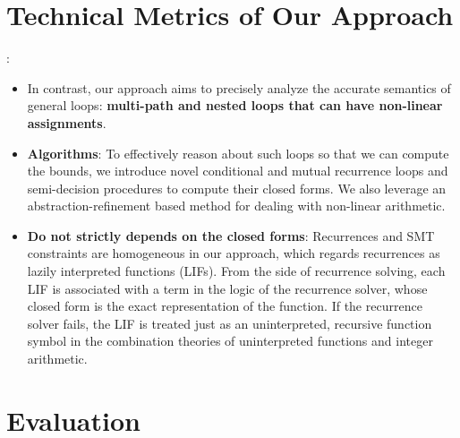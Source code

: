 \documentclass{article}
\begin{document}
\section{Technical Metrics of Our Approach}:
\begin{itemize}
\item In contrast, our approach aims to precisely analyze the accurate semantics of general loops: \textbf{multi-path and nested loops that can have non-linear assignments}. 
\item \textbf{ Algorithms}: To effectively reason about such loops so that we can compute the bounds, we introduce novel conditional and mutual recurrence loops and semi-decision procedures to compute their closed forms. We also leverage an abstraction-refinement based method for dealing with non-linear arithmetic.
\item \textbf{Do not strictly depends on the closed forms}: Recurrences and SMT constraints are homogeneous in our approach, which regards recurrences as lazily interpreted functions (LIFs). From the side of recurrence solving, each LIF is associated with a term in the logic of the recurrence solver, whose closed form is the exact representation of the function. If the recurrence solver fails, the LIF is treated just as an uninterpreted, recursive function symbol in the combination theories of uninterpreted functions and integer arithmetic.
\end{itemize}


\section{Evaluation}
\end{document}
